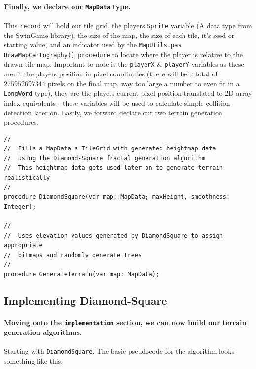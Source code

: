 \documentclass{article}
\begin{document}
\paragraph{Finally, we declare our \texttt{MapData} type.} This \texttt{record} will hold our tile grid, the players \texttt{Sprite} variable (A data type from the SwinGame library), the size of the map, the size of each tile, it's seed or starting value, and an indicator used by the \texttt{MapUtils.pas DrawMapCartography() procedure} to locate where the player is relative to the drawn tile map. Important to note is the \texttt{playerX} \& \texttt{playerY} variables as these aren't the players position in pixel coordinates (there will be a total of $275952697344$ pixels on the final map, way too large a number to even fit in a \texttt{LongWord} type), they are the players current pixel position translated to 2D array index equivalents - these variables will be used to calculate simple collision detection later on. Lastly, we forward declare our two terrain generation procedures.

\begin{verbatim}
//
//	Fills a MapData's TileGrid with generated heightmap data
//	using the Diamond-Square fractal generation algorithm
//	This heightmap data gets used later on to generate terrain realistically
//
procedure DiamondSquare(var map: MapData; maxHeight, smoothness: Integer);
	
//
//	Uses elevation values generated by DiamondSquare to assign appropriate
//	bitmaps and randomly generate trees
//
procedure GenerateTerrain(var map: MapData);
\end{verbatim}


\pagebreak


\subsection{Implementing Diamond-Square}

\paragraph{Moving onto the \texttt{implementation} section, we can now build our terrain generation algorithms.} Starting with \texttt{DiamondSquare}. The basic pseudocode for the algorithm looks something like this:
\end{document}
